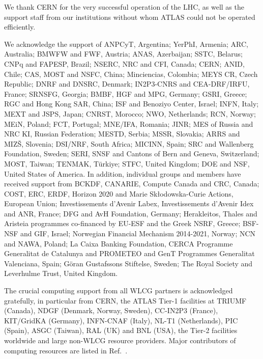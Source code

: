 

We thank CERN for the very successful operation of the LHC, as well as the
support staff from our institutions without whom ATLAS could not be
operated efficiently.

We acknowledge the support of 
ANPCyT, Argentina; 
YerPhI, Armenia; 
ARC, Australia; 
BMWFW and FWF, Austria; 
ANAS, Azerbaijan; 
SSTC, Belarus; 
CNPq and FAPESP, Brazil; 
NSERC, NRC and CFI, Canada; 
CERN; 
ANID, Chile; 
CAS, MOST and NSFC, China; 
Minciencias, Colombia; 
MEYS CR, Czech Republic; 
DNRF and DNSRC, Denmark; 
IN2P3-CNRS and CEA-DRF/IRFU, France; 
SRNSFG, Georgia; 
BMBF, HGF and MPG, Germany; 
GSRI, Greece; 
RGC and Hong Kong SAR, China; 
ISF and Benoziyo Center, Israel; 
INFN, Italy; 
MEXT and JSPS, Japan; 
CNRST, Morocco; 
NWO, Netherlands; 
RCN, Norway; 
MEiN, Poland; 
FCT, Portugal; 
MNE/IFA, Romania; 
JINR; 
MES of Russia and NRC KI, Russian Federation; 
MESTD, Serbia; 
MSSR, Slovakia; 
ARRS and MIZ\v{S}, Slovenia; 
DSI/NRF, South Africa; 
MICINN, Spain; 
SRC and Wallenberg Foundation, Sweden; 
SERI, SNSF and Cantons of Bern and Geneva, Switzerland; 
MOST, Taiwan; 
TENMAK, T\"urkiye; 
STFC, United Kingdom; 
DOE and NSF, United States of America. 
In addition, individual groups and members have received support from 
BCKDF, CANARIE, Compute Canada and CRC, Canada; 
COST, ERC, ERDF, Horizon 2020 and Marie Sk{\l}odowska-Curie Actions, European Union; 
Investissements d'Avenir Labex, Investissements d'Avenir Idex and ANR, France; 
DFG and AvH Foundation, Germany; 
Herakleitos, Thales and Aristeia programmes co-financed by EU-ESF and the Greek NSRF, Greece; 
BSF-NSF and GIF, Israel; 
Norwegian Financial Mechanism 2014-2021, Norway; 
NCN and NAWA, Poland; 
La Caixa Banking Foundation, CERCA Programme Generalitat de Catalunya and PROMETEO and GenT Programmes Generalitat Valenciana, Spain; 
G\"{o}ran Gustafssons Stiftelse, Sweden; 
The Royal Society and Leverhulme Trust, United Kingdom.

The crucial computing support from all WLCG partners is acknowledged gratefully, in particular from CERN, the ATLAS Tier-1 facilities at TRIUMF (Canada), NDGF (Denmark, Norway, Sweden), CC-IN2P3 (France), KIT/GridKA (Germany), INFN-CNAF (Italy), NL-T1 (Netherlands), PIC (Spain), ASGC (Taiwan), RAL (UK) and BNL (USA), the Tier-2 facilities worldwide and large non-WLCG resource providers. Major contributors of computing resources are listed in Ref.~\cite{ATL-SOFT-PUB-2021-003}.

